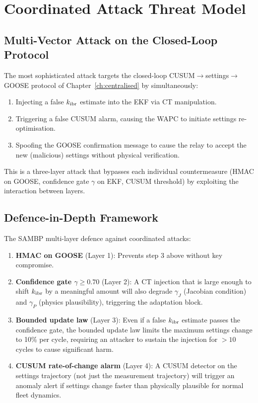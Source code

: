 \section{Coordinated Attack Threat Model}
\label{sec:ch12_coordinated}

\subsection{Multi-Vector Attack on the Closed-Loop Protocol}

The most sophisticated attack targets the closed-loop CUSUM$\to$settings$\to$GOOSE
protocol of Chapter~\ref{ch:centralised} by simultaneously:
\begin{enumerate}
\item Injecting a false $k_\mathrm{ibr}$ estimate into the EKF via CT manipulation.
\item Triggering a false CUSUM alarm, causing the WAPC to initiate
      settings re-optimisation.
\item Spoofing the GOOSE confirmation message to cause the relay to
      accept the new (malicious) settings without physical verification.
\end{enumerate}

This is a three-layer attack that bypasses each individual countermeasure
(HMAC on GOOSE, confidence gate $\gamma$ on EKF, CUSUM threshold) by
exploiting the interaction between layers.

\subsection{Defence-in-Depth Framework}

The SAMBP multi-layer defence against coordinated attacks:
\begin{enumerate}
\item \textbf{HMAC on GOOSE} (Layer 1): Prevents step 3 above without key compromise.
\item \textbf{Confidence gate $\gamma \geq 0.70$} (Layer 2): A CT injection
      that is large enough to shift $k_\mathrm{ibr}$ by a meaningful amount will
      also degrade $\gamma_J$ (Jacobian condition) and $\gamma_P$
      (physics plausibility), triggering the adaptation block.
\item \textbf{Bounded update law} (Layer 3): Even if a false $k_\mathrm{ibr}$
      estimate passes the confidence gate, the bounded update law
      limits the maximum settings change to 10\% per cycle, requiring
      an attacker to sustain the injection for $> 10$ cycles to cause
      significant harm.
\item \textbf{CUSUM rate-of-change alarm} (Layer 4): A CUSUM detector on
      the settings trajectory (not just the measurement trajectory)
      will trigger an anomaly alert if settings change faster than
      physically plausible for normal fleet dynamics.
\end{enumerate}

